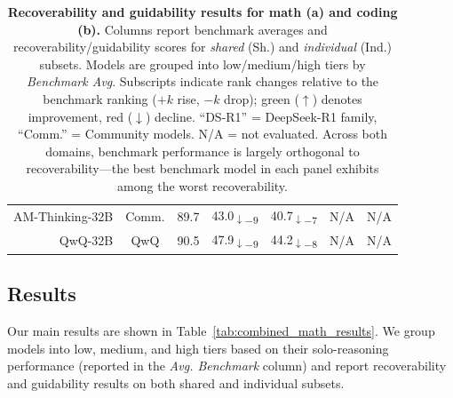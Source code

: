 \documentclass{article} %
\begin{document}
\begin{table}[t]
\begin{tabular}{r|c|c|cc|cc}
    AM-Thinking-32B   & Comm. & 89.7 &
    \cellcolor{red!40}43.0\textsubscript{$\downarrow-9$} &
    \cellcolor{red!40}40.7\textsubscript{$\downarrow-7$} &
    N/A & N/A \\

    QwQ-32B           & QwQ   & 90.5 &
    \cellcolor{red!40}47.9\textsubscript{$\downarrow-9$} &
    \cellcolor{red!40}44.2\textsubscript{$\downarrow-8$} &
    N/A & N/A \\

    \bottomrule
  \end{tabular}
  \caption{\textbf{Recoverability and guidability results for math (a) and coding (b).} Columns report benchmark averages and recoverability/guidability scores for \emph{shared} (Sh.) and \emph{individual} (Ind.) subsets. Models are grouped into low/medium/high tiers by \textit{Benchmark Avg}. Subscripts indicate rank changes relative to the benchmark ranking ($+k$ rise, $-k$ drop); green ($\uparrow$) denotes improvement, red ($\downarrow$) decline. ``DS-R1'' = DeepSeek-R1 family, ``Comm.'' = Community models. N/A = not evaluated. Across both domains, benchmark performance is largely orthogonal to recoverability---the best benchmark model in each panel exhibits among the worst recoverability.}
  \label{tab:combined_math_results}
  \label{tab:combined_coding_results}
\end{table}

\subsection{Results}
\label{sec:evaluation_findings}
Our main results are shown in Table~\ref{tab:combined_math_results}. We group models into low, medium, and high tiers based on their solo-reasoning performance (reported in the \textit{Avg. Benchmark} column) and report recoverability and guidability results on both shared and individual subsets. %
    

\captionsetup[figure]{aboveskip=2pt, belowskip=4pt}
\captionsetup[table]{aboveskip=2pt, belowskip=4pt}
\end{document}
